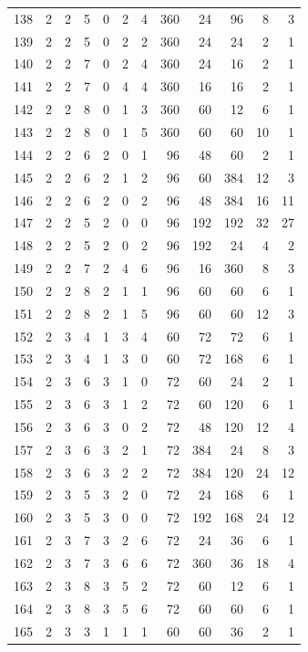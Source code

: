 \documentclass[11pt,a4paper]{article}
\begin{document}
\begin{longtable}{r|rrr|rrr|rrr|rr}
138 & 2 & 2 & 5 & 0 & 2 & 4 & 360 & 24 & 96 & 8 & 3\\
139 & 2 & 2 & 5 & 0 & 2 & 2 & 360 & 24 & 24 & 2 & 1\\
140 & 2 & 2 & 7 & 0 & 2 & 4 & 360 & 24 & 16 & 2 & 1\\
141 & 2 & 2 & 7 & 0 & 4 & 4 & 360 & 16 & 16 & 2 & 1\\
142 & 2 & 2 & 8 & 0 & 1 & 3 & 360 & 60 & 12 & 6 & 1\\
143 & 2 & 2 & 8 & 0 & 1 & 5 & 360 & 60 & 60 & 10 & 1\\
144 & 2 & 2 & 6 & 2 & 0 & 1 & 96 & 48 & 60 & 2 & 1\\
145 & 2 & 2 & 6 & 2 & 1 & 2 & 96 & 60 & 384 & 12 & 3\\
146 & 2 & 2 & 6 & 2 & 0 & 2 & 96 & 48 & 384 & 16 & 11\\
147 & 2 & 2 & 5 & 2 & 0 & 0 & 96 & 192 & 192 & 32 & 27\\
148 & 2 & 2 & 5 & 2 & 0 & 2 & 96 & 192 & 24 & 4 & 2\\
149 & 2 & 2 & 7 & 2 & 4 & 6 & 96 & 16 & 360 & 8 & 3\\
150 & 2 & 2 & 8 & 2 & 1 & 1 & 96 & 60 & 60 & 6 & 1\\
151 & 2 & 2 & 8 & 2 & 1 & 5 & 96 & 60 & 60 & 12 & 3\\
152 & 2 & 3 & 4 & 1 & 3 & 4 & 60 & 72 & 72 & 6 & 1\\
153 & 2 & 3 & 4 & 1 & 3 & 0 & 60 & 72 & 168 & 6 & 1\\
154 & 2 & 3 & 6 & 3 & 1 & 0 & 72 & 60 & 24 & 2 & 1\\
155 & 2 & 3 & 6 & 3 & 1 & 2 & 72 & 60 & 120 & 6 & 1\\
156 & 2 & 3 & 6 & 3 & 0 & 2 & 72 & 48 & 120 & 12 & 4\\
157 & 2 & 3 & 6 & 3 & 2 & 1 & 72 & 384 & 24 & 8 & 3\\
158 & 2 & 3 & 6 & 3 & 2 & 2 & 72 & 384 & 120 & 24 & 12\\
159 & 2 & 3 & 5 & 3 & 2 & 0 & 72 & 24 & 168 & 6 & 1\\
160 & 2 & 3 & 5 & 3 & 0 & 0 & 72 & 192 & 168 & 24 & 12\\
161 & 2 & 3 & 7 & 3 & 2 & 6 & 72 & 24 & 36 & 6 & 1\\
162 & 2 & 3 & 7 & 3 & 6 & 6 & 72 & 360 & 36 & 18 & 4\\
163 & 2 & 3 & 8 & 3 & 5 & 2 & 72 & 60 & 12 & 6 & 1\\
164 & 2 & 3 & 8 & 3 & 5 & 6 & 72 & 60 & 60 & 6 & 1\\
165 & 2 & 3 & 3 & 1 & 1 & 1 & 60 & 60 & 36 & 2 & 1\\

\end{longtable}
\end{document}
